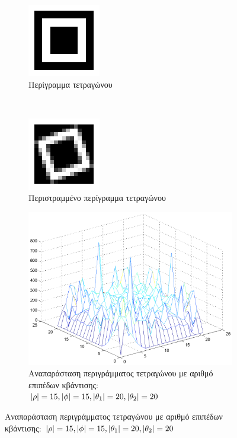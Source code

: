 \begin{figure}
        \centering
        \begin{subfigure}[t]{0.5\textwidth}
                \centerline{\includegraphics[scale = 0.5]{./images/examples/emptyTetragwno.png}}
                \caption{Περίγραμμα τετραγώνου}
        \end{subfigure}%
        ~
        \centering
        \begin{subfigure}[t]{0.5\textwidth}
                \centerline{\includegraphics[scale = 0.5]{./images/examples/emptyRotatedTetragwno.png}}
                \caption{Περιστραμμένο περίγραμμα τετραγώνου}
        \end{subfigure}%

        \centering
        \begin{subfigure}[b]{1\textwidth}
                \centerline{\includegraphics[scale = 0.3]{./images/examples/emptyTetragwno(15152020).png}}
                \caption{Αναπαράσταση περιγράμματος τετραγώνου με αριθμό επιπέδων κβάντισης: $\lvert\rho\rvert = 15,\lvert\phi\rvert = 15,\lvert\theta_1\rvert = 20,\lvert\theta_2\rvert = 20$}
        \end{subfigure}%


\end{figure}
